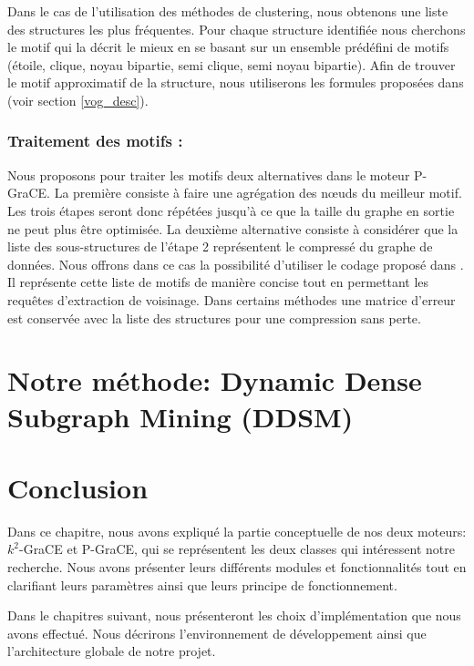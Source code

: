 \documentclass[a4paper,oneside,12pt]{report}
\theoremstyle{definition}
\begin{document}
   
		 
		  Dans le cas de l'utilisation des méthodes de clustering, nous obtenons une liste des structures les plus fréquentes. Pour chaque structure identifiée nous cherchons le motif qui la décrit le mieux en se basant sur un ensemble prédéfini de motifs (étoile, clique, noyau bipartie, semi clique, semi noyau bipartie). Afin de trouver le motif approximatif de la structure, nous utiliserons les formules proposées dans \citep{koutra2015summarizing} (voir section \ref{vog_desc}).
		  
		   
		\subsubsection{Traitement des motifs :}
		
		Nous proposons pour traiter les motifs deux alternatives dans le moteur P-GraCE. La première consiste à faire une agrégation des nœuds du meilleur motif. Les trois étapes seront donc répétées jusqu'à ce que la taille du graphe en sortie ne peut plus être optimisée. La deuxième alternative consiste à considérer que la liste des sous-structures de l'étape 2 représentent le compressé du graphe de données. Nous offrons dans ce cas la possibilité d'utiliser le codage proposé dans \citep{liu2018reducing}. Il représente cette liste de motifs de manière concise tout en permettant les requêtes d'extraction de voisinage. Dans certains méthodes une matrice d'erreur est conservée avec la liste des structures pour une compression sans perte.
		
		
		
	\section{Notre méthode: Dynamic Dense Subgraph Mining (DDSM)}
		
	
	\section{Conclusion}

Dans ce chapitre, nous avons expliqué la partie conceptuelle de nos deux moteurs: $k^2$-GraCE et P-GraCE, qui se représentent les deux classes qui intéressent notre recherche. Nous avons présenter leurs différents modules et fonctionnalités tout en clarifiant leurs paramètres ainsi que leurs principe de fonctionnement.

	Dans le chapitres suivant, nous présenteront les choix d'implémentation que nous avons effectué. Nous décrirons l'environnement de développement ainsi que l'architecture globale de notre projet. 
	
\end{document}
